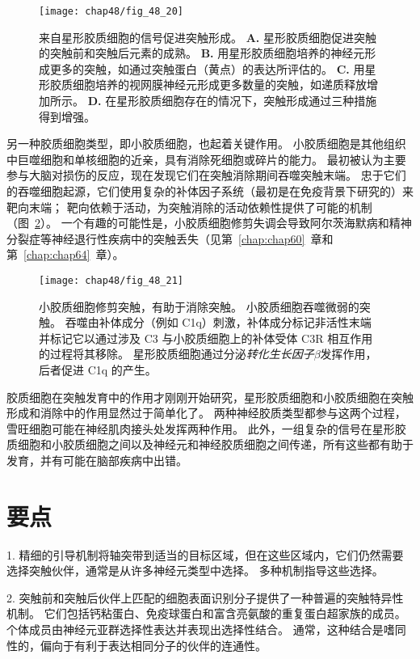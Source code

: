 \begin{figure}[htbp]
	\centering
	\texttt{[image: chap48/fig\_48\_20]}
	\caption{来自星形胶质细胞的信号促进突触形成。
		\textbf{A.} 星形胶质细胞促进突触的突触前和突触后元素的成熟。
		\textbf{B.} 用星形胶质细胞培养的神经元形成更多的突触，如通过突触蛋白（黄点）的表达所评估的。
		\textbf{C.} 用星形胶质细胞培养的视网膜神经元形成更多数量的突触，如递质释放增加所示。
		\textbf{D.} 在星形胶质细胞存在的情况下，突触形成通过三种措施得到增强。}
	\label{fig:48_20}
\end{figure}


另一种胶质细胞类型，即小胶质细胞，也起着关键作用。
小胶质细胞是其他组织中巨噬细胞和单核细胞的近亲，具有消除死细胞或碎片的能力。
最初被认为主要参与大脑对损伤的反应，现在发现它们在突触消除期间吞噬突触末端。
忠于它们的吞噬细胞起源，它们使用复杂的补体因子系统（最初是在免疫背景下研究的）来靶向末端；
靶向依赖于活动，为突触消除的活动依赖性提供了可能的机制（图~\ref{fig:48_21}）。
一个有趣的可能性是，小胶质细胞修剪失调会导致阿尔茨海默病和精神分裂症等神经退行性疾病中的突触丢失（见第~\ref{chap:chap60}~章和第~\ref{chap:chap64}~章）。


\begin{figure}[htbp]
	\centering
	\texttt{[image: chap48/fig\_48\_21]}
	\caption{小胶质细胞修剪突触，有助于消除突触。
		小胶质细胞吞噬微弱的突触。
		吞噬由补体成分（例如 C1q）刺激，补体成分标记非活性末端并标记它以通过涉及 C3 与小胶质细胞上的补体受体 C3R 相互作用的过程将其移除。
		星形胶质细胞通过分泌\textit{转化生长因子$\beta$}发挥作用，后者促进 C1q 的产生\cite{allen2014astrocyte}。}
	\label{fig:48_21}
\end{figure}


胶质细胞在突触发育中的作用才刚刚开始研究，星形胶质细胞和小胶质细胞在突触形成和消除中的作用显然过于简单化了。
两种神经胶质类型都参与这两个过程，雪旺细胞可能在神经肌肉接头处发挥两种作用。
此外，一组复杂的信号在星形胶质细胞和小胶质细胞之间以及神经元和神经胶质细胞之间传递，所有这些都有助于发育，并有可能在脑部疾病中出错。



\section{要点}

1. 精细的引导机制将轴突带到适当的目标区域，但在这些区域内，它们仍然需要选择突触伙伴，通常是从许多神经元类型中选择。
多种机制指导这些选择。


2. 突触前和突触后伙伴上匹配的细胞表面识别分子提供了一种普遍的突触特异性机制。
它们包括钙粘蛋白、免疫球蛋白和富含亮氨酸的重复蛋白超家族的成员。
个体成员由神经元亚群选择性表达并表现出选择性结合。
通常，这种结合是嗜同性的，偏向于有利于表达相同分子的伙伴的连通性。


